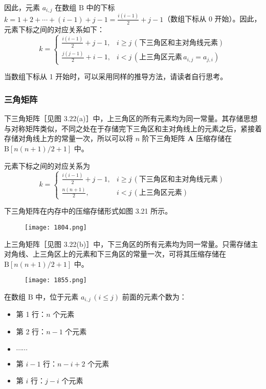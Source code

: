 \documentclass[UTF8]{ctexart}
\begin{document}
	因此，元素 \( a_{i,j} \) 在数组 \( \text{B} \) 中的下标 \( k = 1 + 2 + \cdots + (i - 1) + j - 1 = \frac{i(i - 1)}{2} + j - 1 \)（数组下标从 0 开始）。因此，元素下标之间的对应关系如下：  
	\[
	k = 
	\begin{cases} 
		\displaystyle \frac{i(i - 1)}{2} + j - 1, & i \geq j \, (\text{下三角区和主对角线元素}) \\[6pt]
		\displaystyle \frac{j(j - 1)}{2} + i - 1, & i < j \, (\text{上三角区元素} \, a_{i,j} = a_{j,i}) 
	\end{cases}
	\]  
	
	
	当数组下标从 1 开始时，可以采用同样的推导方法，请读者自行思考。
	
	
	\subsubsection{三角矩阵}
	下三角矩阵［见图 3.22(a)］中，上三角区的所有元素均为同一常量。其存储思想与对称矩阵类似，不同之处在于存储完下三角区和主对角线上的元素之后，紧接着存储对角线上方的常量一次，所以可以将 \( n \) 阶下三角矩阵 \( \boldsymbol{A} \) 压缩存储在 \( \text{B}[n(n + 1) / 2 + 1] \) 中。
	 
	元素下标之间的对应关系为  
	\[
	k = 
	\begin{cases} 
		\displaystyle \frac{i(i - 1)}{2} + j - 1, & i \geq j \, (\text{下三角区和主对角线元素}) \\[6pt]
		\displaystyle \frac{n(n + 1)}{2}, & i < j \, (\text{上三角区元素}) 
	\end{cases}
	\]  
	
	
	下三角矩阵在内存中的压缩存储形式如图 3.21 所示。
	
	\begin{figure}[h]
		\centering
		\centering
		\label{fig:tt}
		\texttt{[image: 1804.png]}
	\end{figure}
	
	上三角矩阵［见图 3.22(b)］中，下三角区的所有元素均为同一常量。只需存储主对角线、上三角区上的元素和下三角区的常量一次，可将其压缩存储在 \( \text{B}[n(n + 1) / 2 + 1] \) 中。
	
	\begin{figure}[h]
		\centering
		\centering
		\label{fig:ttt}
		\texttt{[image: 1855.png]}
	\end{figure}
	
	在数组 \( \text{B} \) 中，位于元素 \( a_{i,j} \, (i \leq j) \) 前面的元素个数为：
	\begin{itemize}
		\item 第 1 行：\( n \) 个元素  
		\item 第 2 行：\( n - 1 \) 个元素  
		\item \(\cdots\cdots\)  
		\item 第 \( i - 1 \) 行：\( n - i + 2 \) 个元素  
		\item 第 \( i \) 行：\( j - i \) 个元素  
	\end{itemize}
	
\end{document}
